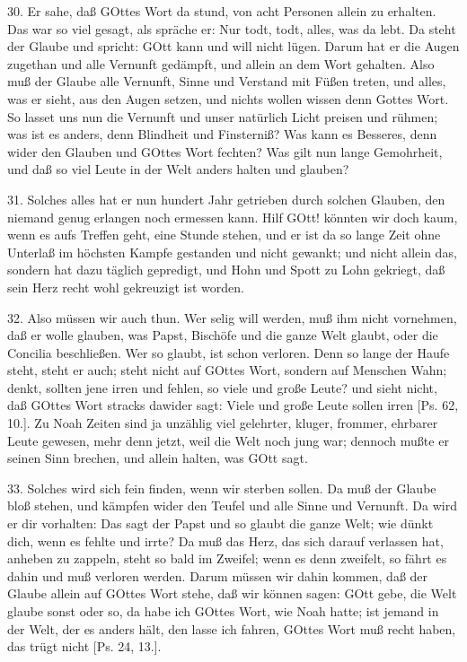 30. Er sahe, daß GOttes Wort da stund, von acht Personen allein zu erhalten. Das war so viel gesagt, als spräche er: Nur todt, todt, alles, was da lebt. Da steht der Glaube und spricht: GOtt kann und will nicht lügen. Darum hat er die Augen zugethan und alle Vernunft gedämpft, und allein an dem Wort gehalten. Also muß der Glaube alle Vernunft, Sinne und Verstand mit Füßen treten, und alles, was er sieht, aus den Augen setzen, und nichts wollen wissen
denn Gottes Wort. So lasset uns nun die Vernunft und unser natürlich Licht preisen und rühmen; was ist es anders, denn Blindheit und Finsterniß? Was kann es Besseres, denn wider den Glauben und GOttes Wort fechten? Was gilt nun lange Gemohrheit, und daß so viel Leute in der Welt anders halten und glauben?

31. Solches alles hat er nun hundert Jahr getrieben durch solchen Glauben, den niemand genug erlangen noch ermessen kann. Hilf GOtt! könnten wir doch kaum, wenn es aufs Treffen geht, eine Stunde stehen, und er ist da so lange Zeit ohne Unterlaß im höchsten Kampfe gestanden und nicht gewankt; und nicht allein das, sondern hat dazu täglich gepredigt, und Hohn und Spott zu Lohn gekriegt, daß sein Herz recht wohl gekreuzigt ist worden.

32. Also müssen wir auch thun. Wer selig will werden, muß ihm nicht vornehmen, daß er wolle glauben, was Papst, Bischöfe und die ganze Welt glaubt, oder die Concilia beschließen. Wer so glaubt, ist schon verloren. Denn so lange der Haufe steht, steht er auch; steht nicht auf GOttes Wort, sondern auf Menschen Wahn; denkt, sollten jene irren und fehlen, so viele und große Leute? und sieht nicht, daß GOttes Wort stracks dawider sagt: Viele und große Leute sollen irren [Ps. 62, 10.]. Zu Noah Zeiten sind ja unzählig viel gelehrter, kluger, frommer, ehrbarer Leute gewesen, mehr denn jetzt, weil die Welt noch jung war; dennoch mußte er seinen Sinn brechen, und allein halten, was GOtt sagt.

33. Solches wird sich fein finden, wenn wir sterben sollen. Da muß der Glaube bloß stehen, und kämpfen wider den Teufel und alle Sinne und Vernunft. Da wird er dir vorhalten: Das sagt der Papst und so glaubt die ganze Welt; wie dünkt dich, wenn es fehlte und irrte? Da muß das Herz, das sich darauf verlassen hat, anheben zu zappeln, steht so bald im Zweifel; wenn es denn zweifelt, so fährt es dahin und muß verloren werden. Darum müssen wir dahin kommen, daß der Glaube allein auf GOttes Wort stehe, daß wir können sagen: GOtt gebe, die Welt glaube sonst oder so, da habe ich GOttes Wort, wie Noah hatte; ist jemand in der Welt, der es anders hält, den lasse ich fahren, GOttes Wort muß recht haben, das trügt nicht [Ps. 24, 13.].

